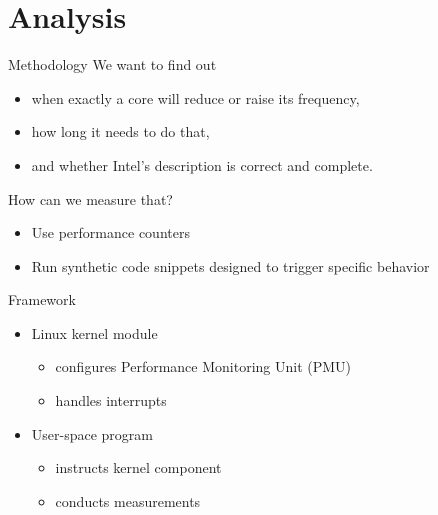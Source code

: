 \section{Analysis}

\begin{frame}[t]{Methodology}
	We want to find out
	\begin{itemize}
		\item when exactly a core will reduce or raise its frequency,
		\item how long it needs to do that,
		\item and whether Intel's description is correct and complete.
	\end{itemize}
	\pause
	How can we measure that?
	\begin{itemize}
		\item Use performance counters
		\item Run synthetic code snippets designed to trigger specific behavior
	\end{itemize}
\end{frame}

\begin{frame}[t]{Framework}
	\begin{itemize}
		\item Linux kernel module
		\begin{itemize}
			\item configures Performance Monitoring Unit (PMU)
			\item handles interrupts
		\end{itemize}
		\item User-space program
		\begin{itemize}
			\item instructs kernel component
			\item conducts measurements
		\end{itemize}
	\end{itemize}
\end{frame}


